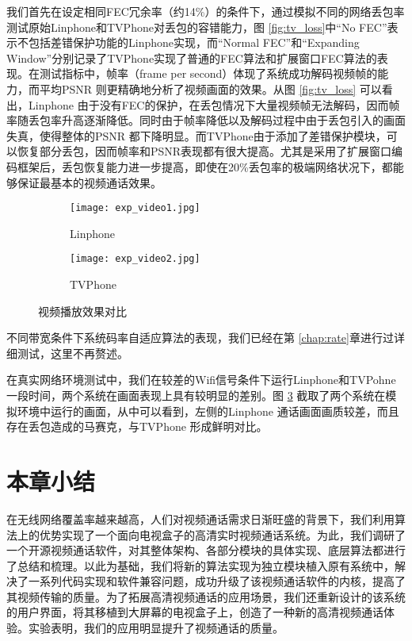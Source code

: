 我们首先在设定相同FEC冗余率（约14\%）的条件下，通过模拟不同的网络丢包率测试原始Linphone和TVPhone对丢包的容错能力，图 \ref{fig:tv_loss}中``No FEC''表示不包括差错保护功能的Linphone实现，而``Normal FEC''和``Expanding Window''分别记录了TVPhone实现了普通的FEC算法和扩展窗口FEC算法的表现。在测试指标中，帧率（frame per second）体现了系统成功解码视频帧的能力，而平均PSNR 则更精确地分析了视频画面的效果。从图 \ref{fig:tv_loss} 可以看出，Linphone 由于没有FEC的保护，在丢包情况下大量视频帧无法解码，因而帧率随丢包率升高逐渐降低。同时由于帧率降低以及解码过程中由于丢包引入的画面失真，使得整体的PSNR 都下降明显。而TVPhone由于添加了差错保护模块，可以恢复部分丢包，因而帧率和PSNR表现都有很大提高。尤其是采用了扩展窗口编码框架后，丢包恢复能力进一步提高，即使在20\%丢包率的极端网络状况下，都能够保证最基本的视频通话效果。

\begin{figure}[htbp]
  \begin{subfigure}[b]{0.5\textwidth}
    \centering
    \texttt{[image: exp\_video1.jpg]}
    \caption{Linphone}
    \label{pic:tv_fps}
  \end{subfigure}
  \begin{subfigure}[b]{0.5\textwidth}
    \centering
    \texttt{[image: exp\_video2.jpg]}
    \caption{TVPhone}
    \label{pic:tv_psnr}
  \end{subfigure}
  \caption{视频播放效果对比}
  \label{fig:exp_video}
\end{figure}

不同带宽条件下系统码率自适应算法的表现，我们已经在第 \ref{chap:rate}章进行过详细测试，这里不再赘述。

在真实网络环境测试中，我们在较差的Wifi信号条件下运行Linphone和TVPohne一段时间，两个系统在画面表现上具有较明显的差别。图 \ref{fig:exp_video} 截取了两个系统在模拟环境中运行的画面，从中可以看到，左侧的Linphone 通话画面画质较差，而且存在丢包造成的马赛克，与TVPhone 形成鲜明对比。

\section{本章小结}
在无线网络覆盖率越来越高，人们对视频通话需求日渐旺盛的背景下，我们利用算法上的优势实现了一个面向电视盒子的高清实时视频通话系统。为此，我们调研了一个开源视频通话软件，对其整体架构、各部分模块的具体实现、底层算法都进行了总结和梳理。以此为基础，我们将新的算法实现为独立模块植入原有系统中，解决了一系列代码实现和软件兼容问题，成功升级了该视频通话软件的内核，提高了其视频传输的质量。为了拓展高清视频通话的应用场景，我们还重新设计的该系统的用户界面，将其移植到大屏幕的电视盒子上，创造了一种新的高清视频通话体验。实验表明，我们的应用明显提升了视频通话的质量。
